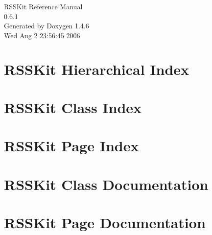 \documentclass[a4paper]{book}
\begin{document}
\begin{titlepage}
\vspace*{7cm}
\begin{center}
{\Large RSSKit Reference Manual\\[1ex]\large 0.6.1 }\\
\vspace*{1cm}
{\large Generated by Doxygen 1.4.6}\\
\vspace*{0.5cm}
{\small Wed Aug 2 23:56:45 2006}\\
\end{center}
\end{titlepage}
\clearemptydoublepage
{}
\tableofcontents
\clearemptydoublepage
{}
\chapter{RSSKit Hierarchical Index}

\chapter{RSSKit Class Index}

\chapter{RSSKit Page Index}

\chapter{RSSKit Class Documentation}





\chapter{RSSKit Page Documentation}

\printindex
\end{document}
